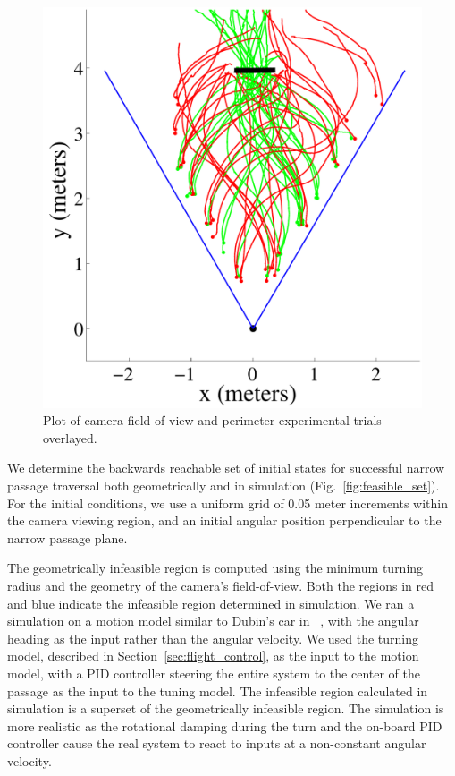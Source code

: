 \documentclass{aamas2013}
\begin{document}
\begin{figure}[tb]
\begin{minipage}[b]{0.45\linewidth}
\includegraphics[width=\textwidth]{figures/flight_paths.pdf}
\caption{Plot of camera field-of-view and perimeter experimental trials overlayed.}
\label{fig:flight_paths}
\end{minipage}
\end{figure}

We determine the backwards reachable set of initial states for successful
narrow passage traversal both geometrically and in simulation 
(Fig.~\ref{fig:feasible_set}). For the initial conditions, we use a uniform 
grid of 0.05 meter increments within the camera viewing region, and an 
initial angular position perpendicular to the narrow passage plane. 

The geometrically infeasible region is computed using the minimum
turning radius and the geometry of the camera's field-of-view. Both the 
regions in red and blue indicate the infeasible region determined in simulation. 
We ran a simulation on a motion model similar to Dubin's car in ~\cite{lavalle:planning}, with the
angular heading as the input rather than the angular velocity. We used the
turning model, described in Section~\ref{sec:flight_control}, as the input to
the motion model, with a PID controller steering the entire system to the
center of the passage as the input to the tuning model. The infeasible region
calculated in simulation is a superset of the geometrically infeasible region.
The simulation is more realistic as the rotational damping during the turn and
the on-board PID controller cause the real system to react to inputs at a
non-constant angular velocity.
\end{document}
